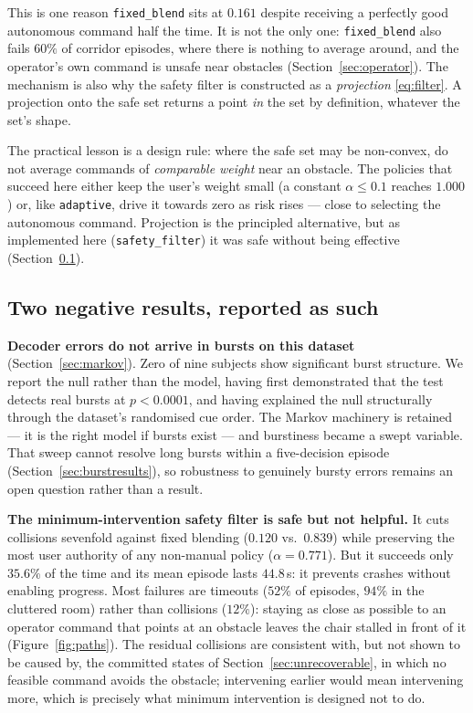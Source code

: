 \documentclass[11pt,a4paper]{article}
\newcommand{\vfixed}{\texttt{fixed\_blend}}
\newcommand{\vadapt}{\texttt{adaptive}}
\newcommand{\vsafety}{\texttt{safety\_filter}}
\theoremstyle{plain}
\theoremstyle{definition}
\begin{document}
This is one reason \vfixed{} sits at $0.161$ despite receiving a
perfectly good autonomous command half the time. It is not the only
one: \vfixed{} also fails $60\%$ of corridor episodes, where there is
nothing to average around, and the operator's own command is unsafe near
obstacles (Section~\ref{sec:operator}). The mechanism is also why the
safety filter is constructed as a \emph{projection} \eqref{eq:filter}. A projection onto
the safe set returns a point \emph{in} the set by definition, whatever
the set's shape.

The practical lesson is a design rule: where the safe set may be
non-convex, do not average commands of \emph{comparable weight} near an
obstacle. The policies that succeed here either keep the user's weight
small (a constant $\alpha \le 0.1$ reaches $1.000$) or, like \vadapt{},
drive it towards zero as risk rises --- close to selecting the
autonomous command. Projection is the principled alternative, but as
implemented here (\vsafety{}) it was safe without being effective
(Section~\ref{sec:negative}).

\subsection{Two negative results, reported as such}
\label{sec:negative}

\textbf{Decoder errors do not arrive in bursts on this dataset}
(Section~\ref{sec:markov}). Zero of nine subjects show significant burst
structure. We report the null rather than the model, having first
demonstrated that the test detects real bursts at $p<0.0001$, and having
explained the null structurally through the dataset's randomised cue
order. The Markov machinery is retained --- it is the right model if
bursts exist --- and burstiness became a swept variable. That sweep
cannot resolve long bursts within a five-decision episode
(Section~\ref{sec:burstresults}), so robustness to genuinely bursty
errors remains an open question rather than a result.

\textbf{The minimum-intervention safety filter is safe but not
helpful.} It cuts collisions sevenfold against fixed blending
($0.120$ vs.\ $0.839$) while preserving the most user authority of any
non-manual policy ($\alpha = 0.771$). But it succeeds only $35.6\%$ of
the time and its mean episode lasts $44.8$\,s: it prevents crashes
without enabling progress. Most failures are timeouts ($52\%$ of
episodes, $94\%$ in the cluttered room) rather than collisions
($12\%$): staying as close as possible to an operator command that
points at an obstacle leaves the chair stalled in front of it
(Figure~\ref{fig:paths}). The residual collisions are consistent with, but
not shown to be caused by, the committed states of
Section~\ref{sec:unrecoverable}, in which no feasible command avoids the
obstacle; intervening earlier would mean intervening more, which is
precisely what minimum intervention is designed not to do.
\end{document}
